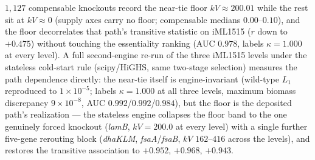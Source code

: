 \documentclass[11pt,a4paper]{article}
\theoremstyle{plain}
\theoremstyle{definition}
\theoremstyle{remark}
\begin{document}
$1{,}127$ compensable knockouts record the near-tie floor
$kV\approx200.01$ while the rest sit at $kV\approx0$ (supply axes
carry no floor; compensable medians $0.00$--$0.10$), and the floor
decorrelates that path's transitive statistic on iML1515 ($r$ down
to $+0.475$) without touching the essentiality ranking (AUC
$0.978$, labels $\kappa=1.000$ at every level). A full
second-engine re-run of the three iML1515 levels under the
stateless cold-start rule (scipy/HiGHS, same two-stage selection)
measures the path dependence directly: the near-tie itself is
engine-invariant (wild-type $L_1$ reproduced to $1\times10^{-5}$;
labels $\kappa=1.000$ at all three levels, maximum biomass
discrepancy $9\times10^{-8}$, AUC $0.992$/$0.992$/$0.984$), but the
floor is the deposited path's realization --- the stateless engine
collapses the floor band to the one genuinely forced knockout
(\emph{lamB}, $kV=200.0$ at every level) with a single further
five-gene rerouting block (\emph{dhaKLM}, \emph{fsaA}/\emph{fsaB},
$kV$ $162$--$416$ across the levels), and restores the transitive
association to $+0.952$, $+0.968$, $+0.943$.
\end{document}
